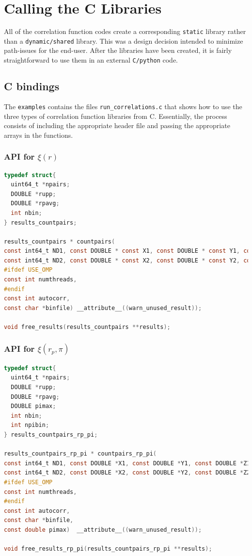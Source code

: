 \documentclass[12pt,titlepage]{article}
\let\stdsection\section
\renewcommand\section{\newpage\stdsection}
\newcommand{\xir}{\ensuremath{{\xi(r)}}\xspace}
\newcommand{\xirppi}{\ensuremath{{\xi(r_p,\pi)}}\xspace}
\begin{document}
\stdsection{Calling the C Libraries}
All of the correlation function codes create a corresponding \texttt{static} library rather than a \texttt{dynamic/shared} library. This was a design decision intended 
to minimize path-issues for the end-user. After the libraries have been created, it is fairly straightforward to use them in an external \texttt{C/python} code. 
\subsection{C bindings}
The \texttt{examples} contains the files \texttt{run\_correlations.c} that shows how to use the three types of correlation function libraries from C. Essentially, the process 
consists of including the appropriate header file and passing the appropriate arrays in the functions. 

\subsubsection{API for \texorpdfstring{\xir}{xi(r)}}
\begin{lstlisting}[language=C,numbers=none,label={code:API_DD},basicstyle=\scriptsize]
typedef struct{
  uint64_t *npairs;
  DOUBLE *rupp;
  DOUBLE *rpavg;
  int nbin;
} results_countpairs;

results_countpairs * countpairs(
const int64_t ND1, const DOUBLE * const X1, const DOUBLE * const Y1, const DOUBLE  * const Z1,
const int64_t ND2, const DOUBLE * const X2, const DOUBLE * const Y2, const DOUBLE  * const Z2,
#ifdef USE_OMP
const int numthreads,
#endif
const int autocorr,
const char *binfile) __attribute__((warn_unused_result));

void free_results(results_countpairs **results);
\end{lstlisting}

\subsubsection{API for \texorpdfstring{\xirppi}{xi(rp,pi)}}
\begin{lstlisting}[language=C,numbers=none,label={code:API_DDrppi},basicstyle=\scriptsize]
typedef struct{
  uint64_t *npairs;
  DOUBLE *rupp;
  DOUBLE *rpavg;
  DOUBLE pimax;
  int nbin;
  int npibin;
} results_countpairs_rp_pi;

results_countpairs_rp_pi * countpairs_rp_pi(
const int64_t ND1, const DOUBLE *X1, const DOUBLE *Y1, const DOUBLE *Z1,
const int64_t ND2, const DOUBLE *X2, const DOUBLE *Y2, const DOUBLE *Z2,
#ifdef USE_OMP
const int numthreads,
#endif
const int autocorr,
const char *binfile,
const double pimax)  __attribute__((warn_unused_result));

void free_results_rp_pi(results_countpairs_rp_pi **results);
\end{lstlisting}
\end{document}
